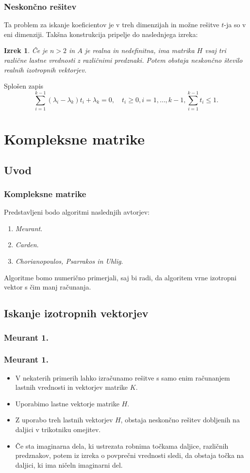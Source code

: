 \documentclass{beamer}
\newtheorem{izrek}{Izrek}
\begin{document}
\begin{frame}
\frametitle{Neskončno rešitev}
Ta problem za iskanje koeficientov je v treh dimenzijah in možne rešitve $t$-ja so v eni dimenziji. Takšna konstrukcija pripelje do naslednjega izreka:
\begin{izrek}
Če je $n>2$ in $A$ je realna in nedefinitna, ima matrika $H$ vsaj tri različne lastne vrednosti z različnimi predznaki. Potem obstaja neskončno število realnih izotropnih vektorjev.
\end{izrek}\pause
\begin{block}{Splošen zapis}
\begin{equation*}
\sum_{i=1}^{k-1} (\lambda_i -\lambda_k)t_i +\lambda_k =0, \quad t_i\ge0, i=1, \dots,k-1, \sum_{i=1}^{k-1}t_i \le1.
\end{equation*}
\end{block}
\end{frame}
\section{Kompleksne matrike} %
\subsection{Uvod}
\begin{frame}
\frametitle{Kompleksne matrike}
Predstavljeni bodo algoritmi naslednjih avtorjev:
\begin{enumerate}
\item \emph{Meurant}.
\item \emph{Carden}.
\item \emph{Chorianopoulos, Psarrakos in Uhlig}.
\end{enumerate}
Algoritme bomo numerično primerjali, saj bi radi, da algoritem vrne izotropni vektor s čim manj računanja.
\end{frame}
\subsection{Iskanje izotropnih vektorjev}
\subsubsection{Meurant 1.}
\begin{frame}
\frametitle{Meurant 1.}
\begin{itemize}
\item V nekaterih primerih lahko izračunamo rešitve s samo enim ra\-ču\-na\-njem lastnih vrednosti in vektorjev matrike $K$.
\item Uporabimo lastne vektorje matrike $H$.
\item Z uporabo treh lastnih vektorjev $H$, obstaja neskončno rešitev dobljenih na daljici v trikotniku omejitev.
\item  Če sta imaginarna dela, ki ustrezata robnima točkama daljice, različnih predznakov, potem iz izreka o povprečni vrednosti sledi, da obstaja točka na daljici, ki ima ničeln imaginarni del.
\end{itemize}
\end{frame}
\end{document}
